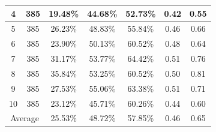 \documentclass{sig-alternate}
\begin{document}
\begin{table}[]
\begin{tabular}{@{}|c|c|c|c|c|c|c|@{}}
		4                                                                               & 385                                                                      & \multicolumn{1}{l|}{19.48\%}                       & \multicolumn{1}{l|}{44.68\%}                       & 52.73\%                                                &  0.42   &  0.55  \\ \midrule 
		5                                                                               & 385                                                                      & 26.23\%                                                 & 48.83\%                                                 & 55.84\%                                                  &  0.46   & 0.66     \\ \midrule
		6
		&
		385
		&23.90\% &
		50.13\% &
		60.52\% & 0.48 &
		0.64     \\  \midrule
		7
		&
		385
		&31.17\% &
		53.77\% &
		64.42\% & 0.51 &
		0.76     \\  \midrule
		8
		&
		385
		&35.84\% &
		53.25\% &
		60.52\% & 0.50 &
		0.81    \\  \midrule
		9
		&
		385
		&27.53\% &
		55.06\% &
		63.38\% & 0.51 &
		0.71    \\  \midrule
		10
		&
		385
		&23.12\% &
		45.71\% &
		60.26\% & 0.44 &
		0.60    \\  \midrule
		\multicolumn{2}{|c|}{Average}                                                                                                                                & 25.53\%                                                 & 48.72\%                                                 & 57.85\%                                                  &   0.46  &  0.65    \\ \bottomrule
		
	\end{tabular}
\end{table}
\end{document}
